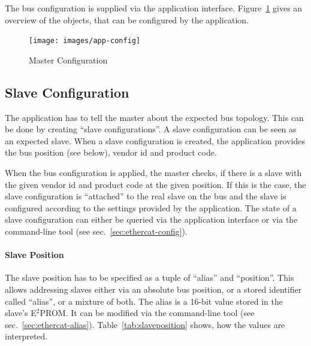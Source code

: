 \documentclass[a4paper,12pt,BCOR6mm,bibtotoc,idxtotoc]{scrbook}
\begin{document}
The bus configuration is supplied via the application interface.
Figure~\ref{fig:app-config} gives an overview of the objects, that can be
configured by the application.

\begin{figure}[htbp]
  \centering
  \texttt{[image: images/app-config]}
  \caption{Master Configuration}
  \label{fig:app-config}
\end{figure}

\subsection{Slave Configuration}

The application has to tell the master about the expected bus topology. This
can be done by creating ``slave configurations''. A slave configuration can be
seen as an expected slave. When a slave configuration is created, the
application provides the bus position (see below), vendor id and product code.

When the bus configuration is applied, the master checks, if there is a slave
with the given vendor id and product code at the given position. If this is
the case, the slave configuration is ``attached'' to the real slave on the bus
and the slave is configured according to the settings provided by the
application. The state of a slave configuration can either be queried via the
application interface or via the command-line tool (see
sec.~\ref{sec:ethercat-config}).

\paragraph{Slave Position} The slave position has to be specified as a tuple
of ``alias'' and ``position''. This allows addressing slaves either via an
absolute bus position, or a stored identifier called ``alias'', or a mixture
of both. The alias is a 16-bit value stored in the slave's E$^2$PROM. It can
be modified via the command-line tool (see sec.~\ref{sec:ethercat-alias}).
Table~\ref{tab:slaveposition} shows, how the values are interpreted.
\end{document}

